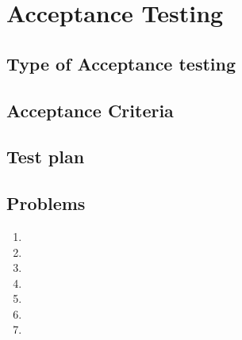 \chapter{Acceptance Testing}
\section{Type of Acceptance testing}
\section{Acceptance Criteria}
\section{Test plan}
\section{Problems}
\begin{enumerate}
    \item 
    \item 
    \item 
    \item 
    \item 
    \item
    \item 
\end{enumerate}